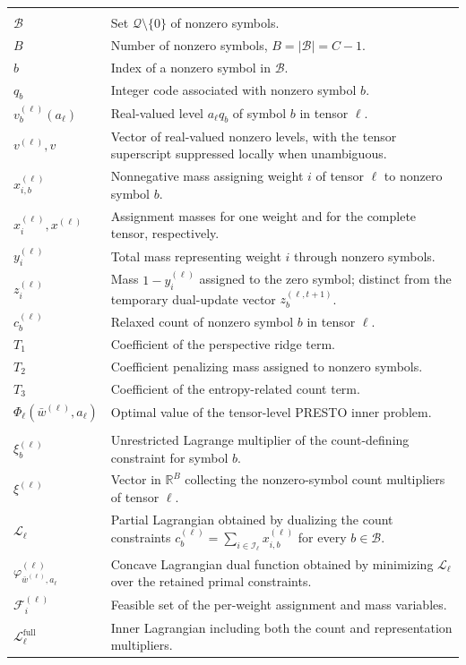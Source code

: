 \documentclass{article}
\begin{document}
\begin{longtable}{>{\raggedright\arraybackslash}p{}
                  >{\raggedright\arraybackslash}p{}}
  \addlinespace
  \multicolumn{2}{l}{\textit{PRESTO inner problem}}\\*
  $\mathcal B$ & Set $\mathcal Q\setminus\{0\}$ of nonzero symbols. \\
  $B$ & Number of nonzero symbols, $B=|\mathcal B|=C-1$. \\
  $b$ & Index of a nonzero symbol in $\mathcal B$. \\
  $q_b$ & Integer code associated with nonzero symbol $b$. \\
  $v_b^{(\ell)}(a_\ell)$ & Real-valued level $a_\ell q_b$ of symbol $b$ in tensor $\ell$. \\
  $v^{(\ell)},v$ & Vector of real-valued nonzero levels, with the tensor superscript suppressed locally when unambiguous. \\
  $x_{i,b}^{(\ell)}$ & Nonnegative mass assigning weight $i$ of tensor $\ell$ to nonzero symbol $b$. \\
  $x_i^{(\ell)},x^{(\ell)}$ & Assignment masses for one weight and for the complete tensor, respectively. \\
  $y_i^{(\ell)}$ & Total mass representing weight $i$ through nonzero symbols. \\
  $z_i^{(\ell)}$ & Mass $1-y_i^{(\ell)}$ assigned to the zero symbol; distinct from the temporary dual-update vector $z_b^{(\ell,t+1)}$. \\
  $c_b^{(\ell)}$ & Relaxed count of nonzero symbol $b$ in tensor $\ell$. \\
  $T_1$ & Coefficient of the perspective ridge term. \\
  $T_2$ & Coefficient penalizing mass assigned to nonzero symbols. \\
  $T_3$ & Coefficient of the entropy-related count term. \\
  $\Phi_\ell(\bar w^{(\ell)},a_\ell)$ & Optimal value of the tensor-level PRESTO inner problem. \\

  \addlinespace
  \multicolumn{2}{l}{\textit{Lagrangian relaxation and decomposition}}\\*
  $\xi_b^{(\ell)}$ & Unrestricted Lagrange multiplier of the count-defining constraint for symbol $b$. \\
  $\xi^{(\ell)}$ & Vector in $\mathbb R^B$ collecting the nonzero-symbol count multipliers of tensor $\ell$. \\
  $\mathscr L_\ell$ & Partial Lagrangian obtained by dualizing the count constraints
  $c_b^{(\ell)}=\sum_{i\in\mathcal I_\ell}x_{i,b}^{(\ell)}$ for every
  $b\in\mathcal B$. \\
  $\varphi_{\bar w^{(\ell)},a_\ell}^{(\ell)}$ & Concave Lagrangian dual function obtained by minimizing $\mathscr L_\ell$ over the retained primal constraints. \\
  $\mathcal F_i^{(\ell)}$ & Feasible set of the per-weight assignment and mass variables. \\
  $\mathscr L_\ell^{\mathrm{full}}$ & Inner Lagrangian including both the count and representation multipliers. \\


\end{longtable}
\end{document}
